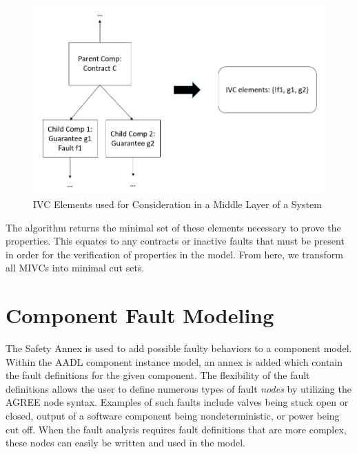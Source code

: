 \begin{figure}[h!]
	\hspace*{-2cm}
	\vspace{-0.1in} 
	\begin{center}
		\includegraphics[scale=0.5]{images/ivcElements2.png}
	\caption{IVC Elements used for Consideration in a Middle Layer of a System}
		\label{fig:ivcElements2}
	\end{center}
\end{figure}

The \aivcalg algorithm returns the minimal set of these elements necessary to prove the properties. This equates to any contracts or inactive faults that must be present in order for the verification of properties in the model. From here, we transform all MIVCs into minimal cut sets.


\section{Component Fault Modeling}
The Safety Annex is used to add possible faulty behaviors to a component model. Within the AADL component instance model, an annex is added which contain the fault definitions for the given component. The flexibility of the fault definitions allows the user to define numerous types of fault \textit{nodes} by utilizing the AGREE node syntax. %
Examples of such faults include valves being stuck open or closed, output of a software component being nondeterministic, or power being cut off.  When the fault analysis requires fault definitions that are more complex, these nodes can easily be written and used in the model. 

